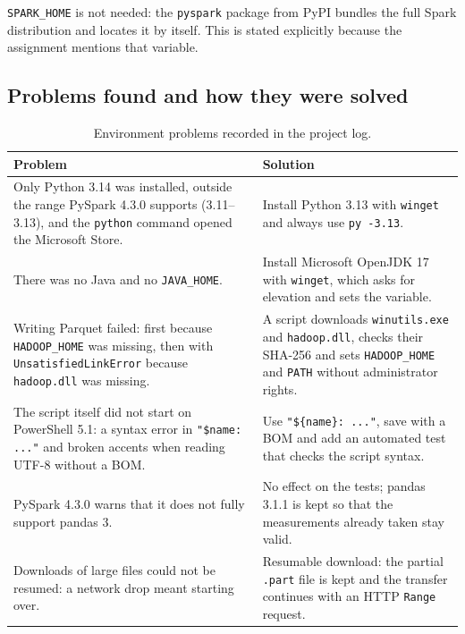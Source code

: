 \documentclass[11pt,a4paper]{article}
\begin{document}
\texttt{SPARK\_HOME} is not needed: the \texttt{pyspark} package from PyPI bundles the full
Spark distribution and locates it by itself. This is stated explicitly because the
assignment mentions that variable.

\subsection{Problems found and how they were solved}

\begin{table}[H]
\centering
\small
\caption{Environment problems recorded in the project log.}
\label{tab:problems}
\begin{tabularx}{\textwidth}{XX}
\toprule
Problem & Solution \\
\midrule
Only Python 3.14 was installed, outside the range PySpark 4.3.0 supports (3.11--3.13), and the \texttt{python} command opened the Microsoft Store. &
Install Python 3.13 with \texttt{winget} and always use \texttt{py -3.13}. \\
There was no Java and no \texttt{JAVA\_HOME}. &
Install Microsoft OpenJDK 17 with \texttt{winget}, which asks for elevation and sets the variable. \\
Writing Parquet failed: first because \texttt{HADOOP\_HOME} was missing, then with \texttt{UnsatisfiedLinkError} because \texttt{hadoop.dll} was missing. &
A script downloads \texttt{winutils.exe} and \texttt{hadoop.dll}, checks their SHA-256 and sets \texttt{HADOOP\_HOME} and \texttt{PATH} without administrator rights. \\
The script itself did not start on PowerShell 5.1: a syntax error in \texttt{"\$name: ..."} and broken accents when reading UTF-8 without a BOM. &
Use \texttt{"\$\{name\}: ..."}, save with a BOM and add an automated test that checks the script syntax. \\
PySpark 4.3.0 warns that it does not fully support pandas 3. &
No effect on the tests; pandas 3.1.1 is kept so that the measurements already taken stay valid. \\
Downloads of large files could not be resumed: a network drop meant starting over. &
Resumable download: the partial \texttt{.part} file is kept and the transfer continues with an HTTP \texttt{Range} request. \\
\bottomrule
\end{tabularx}
\end{table}

\end{document}
